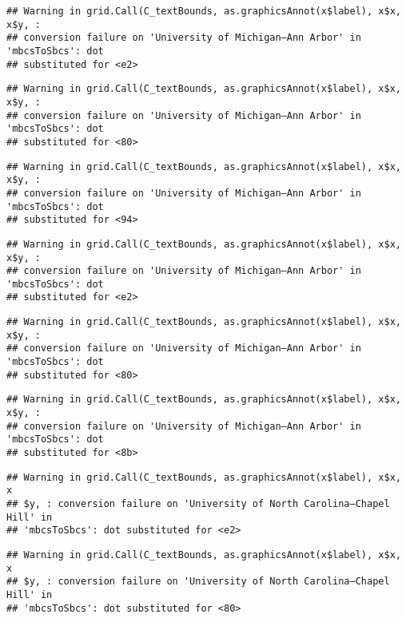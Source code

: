 \documentclass[]{article}
\begin{document}
\begin{verbatim}
## Warning in grid.Call(C_textBounds, as.graphicsAnnot(x$label), x$x, x$y, :
## conversion failure on 'University of Michigan—​Ann Arbor' in 'mbcsToSbcs': dot
## substituted for <e2>
\end{verbatim}

\begin{verbatim}
## Warning in grid.Call(C_textBounds, as.graphicsAnnot(x$label), x$x, x$y, :
## conversion failure on 'University of Michigan—​Ann Arbor' in 'mbcsToSbcs': dot
## substituted for <80>
\end{verbatim}

\begin{verbatim}
## Warning in grid.Call(C_textBounds, as.graphicsAnnot(x$label), x$x, x$y, :
## conversion failure on 'University of Michigan—​Ann Arbor' in 'mbcsToSbcs': dot
## substituted for <94>
\end{verbatim}

\begin{verbatim}
## Warning in grid.Call(C_textBounds, as.graphicsAnnot(x$label), x$x, x$y, :
## conversion failure on 'University of Michigan—​Ann Arbor' in 'mbcsToSbcs': dot
## substituted for <e2>
\end{verbatim}

\begin{verbatim}
## Warning in grid.Call(C_textBounds, as.graphicsAnnot(x$label), x$x, x$y, :
## conversion failure on 'University of Michigan—​Ann Arbor' in 'mbcsToSbcs': dot
## substituted for <80>
\end{verbatim}

\begin{verbatim}
## Warning in grid.Call(C_textBounds, as.graphicsAnnot(x$label), x$x, x$y, :
## conversion failure on 'University of Michigan—​Ann Arbor' in 'mbcsToSbcs': dot
## substituted for <8b>
\end{verbatim}

\begin{verbatim}
## Warning in grid.Call(C_textBounds, as.graphicsAnnot(x$label), x$x, x
## $y, : conversion failure on 'University of North Carolina—​Chapel Hill' in
## 'mbcsToSbcs': dot substituted for <e2>
\end{verbatim}

\begin{verbatim}
## Warning in grid.Call(C_textBounds, as.graphicsAnnot(x$label), x$x, x
## $y, : conversion failure on 'University of North Carolina—​Chapel Hill' in
## 'mbcsToSbcs': dot substituted for <80>
\end{verbatim}
\end{document}
